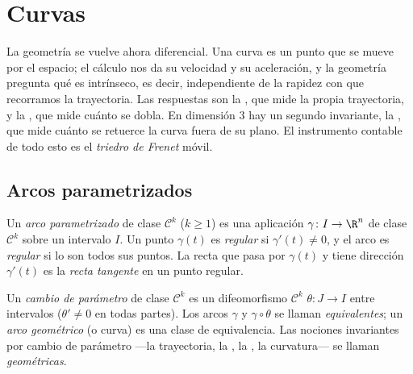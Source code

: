 \chapter{Curvas}\label{ch:b2:curves}

La geometría se vuelve ahora diferencial. Una curva es un punto que se
mueve por el espacio; el cálculo nos da su velocidad y su aceleración,
y la geometría pregunta qué es intrínseco, es decir, independiente de
la rapidez con que recorramos la trayectoria. Las respuestas son la
\emph{}, que mide la propia trayectoria, y la
\emph{}, que mide cuánto se dobla. En dimensión $3$ hay un
segundo invariante, la \emph{}, que mide cuánto se retuerce la
curva fuera de su plano. El instrumento contable de todo esto es el
\emph{triedro de Frenet} móvil.

\section{Arcos parametrizados}

\begin{definition}\label{def:b2:curves:arc}
Un \emph{arco parametrizado} de clase
$\mathcal{C}^k$ ($k \geq 1$) es una aplicación $\gamma \colon I \to
\R^n$ de clase $\mathcal{C}^k$ sobre un intervalo $I$. Un punto
$\gamma(t)$ es \emph{regular} si $\gamma'(t) \neq 0$, y el arco es
\emph{regular} si lo son todos sus puntos. La recta que pasa por
$\gamma(t)$ y tiene dirección $\gamma'(t)$ es la \emph{recta
tangente} en un punto regular.
\end{definition}

\begin{definition}\label{def:b2:curves:reparam}
Un \emph{cambio de parámetro} de clase
$\mathcal{C}^k$ es un difeomorfismo $\mathcal{C}^k$ $\theta \colon J
\to I$ entre intervalos ($\theta' \neq 0$ en todas partes). Los arcos
$\gamma$ y $\gamma \circ \theta$ se llaman \emph{equivalentes}; un
\emph{arco geométrico} (o curva) es una clase
de equivalencia. Las nociones invariantes por cambio de parámetro
---la trayectoria, la , la , la
curvatura--- se llaman \emph{geométricas}.
\end{definition}


